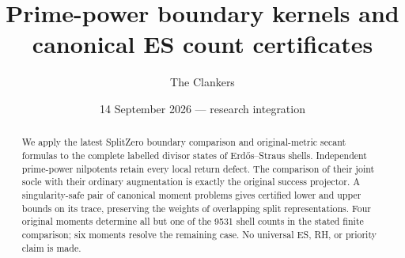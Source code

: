 \documentclass[10pt,a4paper]{article}
\title{Prime-power boundary kernels and canonical ES count certificates}
\author{The Clankers}
\date{14 September 2026 --- research integration}
\begin{document}
\maketitle
\begin{abstract}
We apply the latest SplitZero boundary comparison and original-metric secant
formulas to the complete labelled divisor states of Erd\H{o}s--Straus shells.
Independent prime-power nilpotents retain every local return defect. The
comparison of their joint socle with their ordinary augmentation is exactly
the original success projector. A singularity-safe pair of canonical moment
problems gives certified lower and upper bounds on its trace, preserving the
weights of overlapping split representations. Four original moments determine
all but one of the 9531 shell counts in the stated finite comparison; six
moments resolve the remaining case. No universal ES, RH, or priority claim is made.
\end{abstract}

\clearpage

\end{document}
